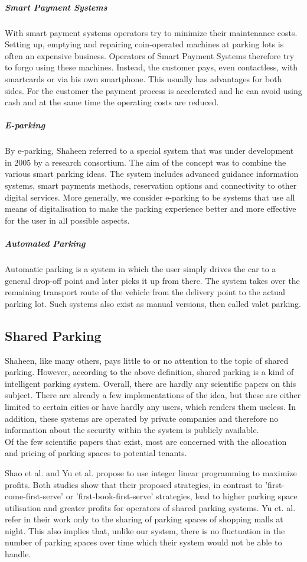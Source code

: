 \documentclass[
a4paper,     %
titlepage,   %
14pt         %
]{scrartcl}  %
\theoremstyle{mystyle}
\begin{document}
\subparagraph{Smart Payment Systems}
With smart payment systems operators try to minimize their maintenance costs. Setting up, emptying and repairing coin-operated machines at parking lots is often an expensive business. Operators of Smart Payment Systems therefore try to forgo using these machines. Instead, the customer pays, even contactless, with smartcards or via his own smartphone. This usually has advantages for both sides. For the customer the payment process is accelerated and he can avoid using cash and at the same time the operating costs are reduced.

\subparagraph{E-parking}
By e-parking, Shaheen referred to a special system that was under development in 2005 by a research consortium. The aim of the concept was to combine the various smart parking ideas. The system includes advanced guidance information systems, smart payments methods, reservation options and connectivity to other digital services. More generally, we consider e-parking to be systems that use all means of digitalisation to make the parking experience better and more effective for the user in all possible aspects.

\subparagraph{Automated Parking}
Automatic parking is a system in which the user simply drives the car to a general drop-off point and later picks it up from there. The system takes over the remaining transport route of the vehicle from the delivery point to the actual parking lot. Such systems also exist as manual versions, then called valet parking.

\subsection{Shared Parking}
Shaheen, like many others, pays little to or no attention to the topic of shared parking. However, according to the above definition, shared parking is a kind of intelligent parking system. Overall, there are hardly any scientific papers on this subject. There are already a few implementations of the idea, but these are either limited to certain cities or have hardly any users, which renders them useless. In addition, these systems are operated by private companies and therefore no information about the security within the system is publicly available.\\

Of the few scientific papers that exist, most are concerned with the allocation and pricing of parking spaces to potential tenants.

Shao et al. \cite{shao2016simple} and Yu et al. \cite{yu2018optimal} propose to use integer linear programming to maximize profits. Both studies show that their proposed strategies, in contrast to 'first-come-first-serve' or 'first-book-first-serve' strategies, lead to higher parking space utilisation and greater profits for operators of shared parking systems. Yu et. al. refer in their work only to the sharing of parking spaces of shopping malls at night. This also implies that, unlike our system, there is no fluctuation in the number of parking spaces over time which their system would not be able to handle.
\end{document}
